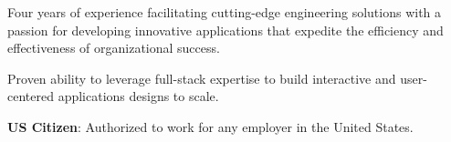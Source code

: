\begin{cventries}
  \cventry
    {}
    {}
    {}
    {}
    {
      \vspace{-7mm}\begin{cvitems}
\item {Four years of experience facilitating cutting-edge engineering solutions with a passion for developing innovative applications that expedite the efficiency and effectiveness of organizational success.}\vspace{1mm}  
\item {Proven ability to leverage full-stack expertise to build interactive and user-centered applications designs to scale.}\vspace{1mm}
\item { \textbf{US Citizen}: Authorized to work for any employer in the United States.}\vspace{1mm}
\end{cvitems}
    }
\end{cventries}
